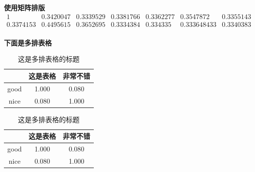 \documentclass{cumcmthesis} %
\begin{document}
\textbf{使用矩阵排版}
\[
    \begin{matrix}
        1         & 0.3420047 & 0.3339529 & 0.3381766 & 0.3362277 & 0.3547872   & 0.3355143 \\
        0.3374153 & 0.4495615 & 0.3652695 & 0.3334384 & 0.334335  & 0.333648433 & 0.3340383 \\
    \end{matrix}
\]

\textbf{下面是多排表格}

\begin{table}[H]
    \caption{这是多排表格的标题}
    \begin{minipage}[t]{0.48\textwidth}
        \centering
        \setlength{\belowcaptionskip}{3pt} %
        \renewcommand\arraystretch{1} %
        \setlength{\tabcolsep}{4mm} %
        \label{}
        \begin{tabular}{ccc}
            \toprule[1.5pt]
                     & 这是表格  & 非常不错 \\
            \midrule
            good     & 1.000 & 0.080    \\
            nice & 0.080 & 1.000    \\
            \bottomrule[1.5pt]
        \end{tabular}
    \end{minipage} %
    \begin{minipage}[t]{0.48\textwidth}
        \centering
        \setlength{\belowcaptionskip}{3pt} %
        \renewcommand\arraystretch{1} %
        \setlength{\tabcolsep}{4mm} %
        \label{}
        \begin{tabular}{ccc}
            \toprule[1.5pt]
                     & 这是表格  & 非常不错 \\
            \midrule
            good     & 1.000 & 0.080    \\
            nice & 0.080 & 1.000    \\
            \bottomrule[1.5pt]
        \end{tabular}
    \end{minipage}
\end{table}
\end{document}

